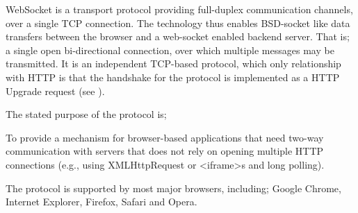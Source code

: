 WebSocket is a transport protocol providing full-duplex communication channels,
over a single \acs{TCP} connection. The technology thus enables BSD-socket like data
transfers between the browser and a web-socket enabled backend server. That is;
a single open bi-directional connection, over which multiple messages may be
transmitted.
\newline\newline
It is an independent \acs{TCP}-based protocol, which only relationship with \acs{HTTP} is
that the handshake for the protocol is implemented as a \acs{HTTP} Upgrade request
(see \citep{RFC6455}).

The stated purpose of the protocol is;
\begin{displayquote}
To provide a mechanism for browser-based applications that need two-way
communication with servers that does not rely on opening multiple \acs{HTTP}
connections (e.g., using XMLHttpRequest or <iframe>s and long polling).
\end{displayquote}
The protocol is supported by most major browsers, including; Google Chrome,
Internet Explorer, Firefox, Safari and Opera. 
